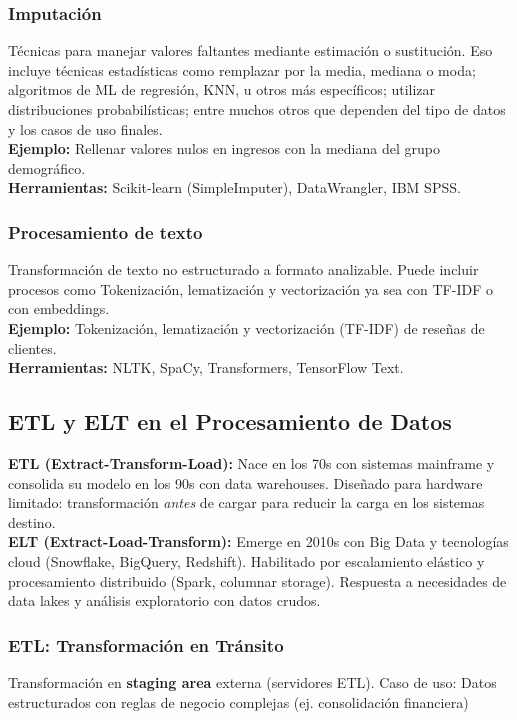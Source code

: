 \documentclass[12pt]{book}
\begin{document}
\subsubsection{Imputación}
Técnicas para manejar valores faltantes mediante estimación o sustitución. Eso incluye técnicas 
estadísticas como remplazar por la media, mediana o moda; algoritmos de ML de regresión, KNN, u 
otros más específicos; utilizar distribuciones probabilísticas; entre muchos otros que dependen 
del tipo de datos y los casos de uso finales.\\

\textbf{Ejemplo:} Rellenar valores nulos en ingresos con la mediana del grupo demográfico.\\

\textbf{Herramientas:} Scikit-learn (SimpleImputer), DataWrangler, IBM SPSS.

\subsubsection{Procesamiento de texto}
Transformación de texto no estructurado a formato analizable. Puede incluir procesos como Tokenización, lematización y vectorización ya sea con TF-IDF o con embeddings.\\

\textbf{Ejemplo:} Tokenización, lematización y vectorización (TF-IDF) de reseñas de clientes.\\

\textbf{Herramientas:} NLTK, SpaCy, Transformers, TensorFlow Text.


\subsection{ETL y ELT en el Procesamiento de Datos}
\textbf{ETL (Extract-Transform-Load):} Nace en los 70s con sistemas mainframe y consolida 
su modelo en los 90s con data warehouses. Diseñado para hardware limitado: transformación 
\textit{antes} de cargar para reducir la carga en los sistemas destino. \\
\textbf{ELT (Extract-Load-Transform):} Emerge en 2010s con Big Data y tecnologías 
cloud (Snowflake, BigQuery, Redshift). Habilitado por escalamiento elástico y procesamiento 
distribuido (Spark, columnar storage). Respuesta a necesidades de data lakes y análisis 
exploratorio con datos crudos.

\subsubsection{ETL: Transformación en Tránsito}
Transformación en \textbf{staging area} externa (servidores ETL). Caso de uso: Datos 
estructurados con reglas de negocio complejas (ej. consolidación financiera)
\end{document}
